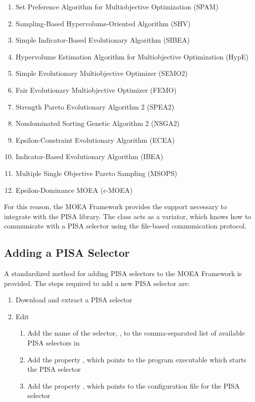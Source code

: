 \begin{enumerate}
  \item Set Preference Algorithm for Multiobjective Optimization (SPAM)
  \item Sampling-Based Hypervolume-Oriented Algorithm (SHV)
  \item Simple Indicator-Based Evolutionary Algorithm (SIBEA)
  \item Hypervolume Estimation Algorithm for Multiobjective Optimization (HypE)
  \item Simple Evolutionary Multiobjective Optimizer (SEMO2)
  \item Fair Evolutionary Multiobjective Optimizer (FEMO)
  \item Strength Pareto Evolutionary Algorithm 2 (SPEA2)
  \item Nondominated Sorting Genetic Algorithm 2 (NSGA2)
  \item Epsilon-Constraint Evolutionary Algorithm (ECEA)
  \item Indicator-Based Evolutionary Algorithm (IBEA)
  \item Multiple Single Objective Pareto Sampling (MSOPS)
  \item Epsilon-Dominance MOEA ($\epsilon$-MOEA)
\end{enumerate}

For this reason, the MOEA Framework provides the support necessary to integrate with the PISA library.  The  class acts as a variator, which knows how to communicate with a PISA selector using the file-based communication protocol.

\subsection{Adding a PISA Selector}
A standardized method for adding PISA selectors to the MOEA Framework is provided.  The steps required to add a new PISA selector are:

\begin{enumerate}
  \item Download and extract a PISA selector
  \item Edit 
    \begin{enumerate}
      \item Add the name of the selector, , to the comma-separated list of available PISA selectors in 
      \item Add the property , which points to the program executable which starts the PISA selector
      \item Add the property ,  which points to the configuration file for the PISA selector
    \end{enumerate}
\end{enumerate}

